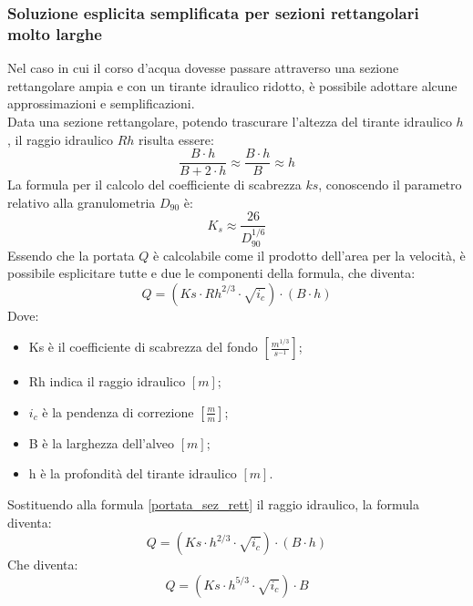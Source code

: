 \subsubsection{Soluzione esplicita semplificata per sezioni rettangolari molto larghe}
Nel caso in cui il corso d'acqua dovesse passare attraverso una sezione rettangolare ampia e con un tirante idraulico ridotto, è possibile adottare alcune approssimazioni e semplificazioni.\\
Data una sezione rettangolare, potendo trascurare l'altezza del tirante idraulico $h$, il raggio idraulico $Rh$ risulta essere:
\begin{equation}
    \frac{B \cdot h}{B + 2\cdot h} \approx \frac{B \cdot h}{B} \approx h
\end{equation}
La formula per il calcolo del coefficiente di scabrezza $ks$, conoscendo il parametro relativo alla granulometria $D_{90}$ è:
\begin{equation}
K_s \approx \frac{26}{D_{90}^{1/6}}
\end{equation}
Essendo che la portata $Q$ è calcolabile come il prodotto dell'area per la velocità, è possibile esplicitare tutte e due le componenti della formula, che diventa:
\begin{equation}
    Q = (Ks \cdot Rh^{2/3} \cdot \sqrt{i_c}) \cdot (B \cdot h)
    \label{portata_sez_rett}
\end{equation}
Dove:
\begin{itemize}
    \item Ks è il coefficiente di scabrezza del fondo $\left[\frac{m^{1/3}}{s^{-1}}\right]$;
    \item Rh indica il raggio idraulico $[m]$;
    \item $i_c$ è la pendenza di correzione $\left[\frac{m}{m}\right]$;
    \item B è la larghezza dell'alveo $[m]$;
    \item h è la profondità del tirante idraulico $[m]$.
\end{itemize}
Sostituendo alla formula \ref{portata_sez_rett} il raggio idraulico, la formula diventa:
\begin{equation}
    Q = (Ks \cdot h^{2/3} \cdot \sqrt{i_c}) \cdot (B \cdot h)
\end{equation}
Che diventa:
\begin{equation}
    Q = (Ks \cdot h^{5/3} \cdot \sqrt{i_c}) \cdot B
\end{equation}

